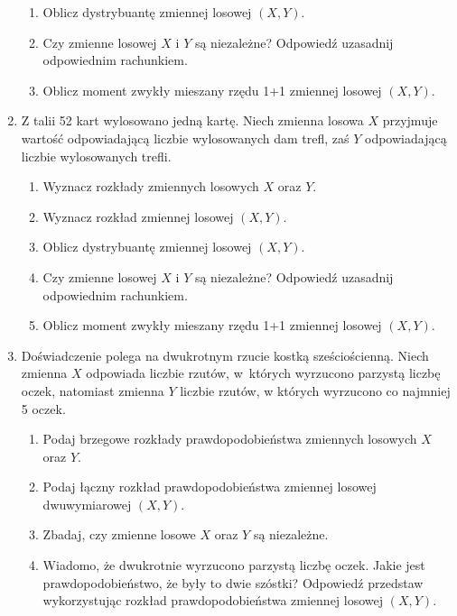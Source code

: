 \documentclass{mwart}
\newcommand{\ans}[1]{}
\newcommand{\ans}[1]{\emph{Odpowiedź:} #1}
\begin{document}
\begin{enumerate}
\begin{enumerate}
\item Oblicz dystrybuantę zmiennej losowej $(X,Y)$. \ans{\[F(u,v)=\begin{cases} 
	0 & u\leq 0 \lor v\leq 0 \\ 
	\frac{36}{52} & 0<u\leq 1 \land 0<v\leq 1 \\
	\frac{39}{52} & u>1 \land 0<v\leq 1 \\
	\frac{48}{52} & 0<u\leq 1 \land v>1 \\
	1 & u>1 \land v>1
	\end{cases}\]}
\item Czy zmienne losowej $X$ i $Y$ są niezależne? Odpowiedź uzasadnij odpowiednim rachunkiem. \ans{Tak}
\item Oblicz moment zwykły mieszany rzędu 1+1 zmiennej losowej $(X,Y)$. \ans{$EXY=\frac{1}{52}$}
\end{enumerate}

\clearpage
\item Z talii 52 kart wylosowano jedną kartę. Niech zmienna losowa $X$ przyjmuje wartość odpowiadającą liczbie wylosowanych dam trefl, zaś $Y$ odpowiadającą liczbie wylosowanych trefli.
\begin{enumerate}
\item Wyznacz rozkłady zmiennych losowych $X$ oraz $Y$. \ans{$P(X=0)=\frac{51}{52} P(X=1)=\frac{1}{52} P(Y=1)=\frac{13}{52} P(Y=0)=\frac{39}{52}$}
\item Wyznacz rozkład zmiennej losowej $(X,Y)$. \ans{$P(0,0)=\frac{39}{52} P(1,0)=0 P(0,1)=\frac{12}{52} P(1,1)=\frac{1}{52}$}
\item Oblicz dystrybuantę zmiennej losowej $(X,Y)$.
\item Czy zmienne losowej $X$ i $Y$ są niezależne? Odpowiedź uzasadnij odpowiednim rachunkiem. \ans{Nie, $0=P(1,0)\neq P(X=1)P(Y=0)=\frac{39}{52^2}$}
\item Oblicz moment zwykły mieszany rzędu 1+1 zmiennej losowej $(X,Y)$. \ans{$EXY=\frac{1}{52}$}
\end{enumerate}
\item Doświadczenie polega na dwukrotnym rzucie kostką sześciościenną. Niech zmienna $X$ odpowiada liczbie rzutów, w~których wyrzucono parzystą liczbę oczek, natomiast zmienna $Y$ liczbie rzutów, w których wyrzucono co najmniej 5 oczek.
\begin{enumerate}
\item Podaj brzegowe rozkłady prawdopodobieństwa zmiennych losowych $X$ oraz $Y$.
\item Podaj łączny rozkład prawdopodobieństwa zmiennej losowej dwuwymiarowej $(X,Y)$.
\item Zbadaj, czy zmienne losowe $X$ oraz $Y$ są niezależne.
\item Wiadomo, że dwukrotnie wyrzucono parzystą liczbę oczek. Jakie jest prawdopodobieństwo, że były to dwie szóstki? Odpowiedź przedstaw wykorzystując rozkład prawdopodobieństwa zmiennej losowej $(X,Y)$.
\end{enumerate}


\end{enumerate}
\end{document}
